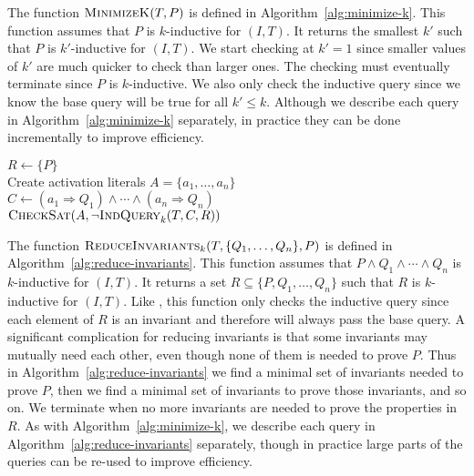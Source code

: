 The function $\textsc{MinimizeK}(T, P)$ is defined in
Algorithm~\ref{alg:minimize-k}. This function assumes that $P$ is
$k$-inductive for $(I, T)$. It returns the smallest $k'$ such that $P$
is $k'$-inductive for $(I, T)$. We start checking at $k' = 1$ since
smaller values of $k'$ are much quicker to check than larger ones. The
checking must eventually terminate since $P$ is $k$-inductive. We also
only check the inductive query since we know the base query will be
true for all $k' \leq k$. Although we describe each query in
Algorithm~\ref{alg:minimize-k} separately, in practice they can be
done incrementally to improve efficiency.

\begin{algorithm}[t]
  $R \leftarrow \{P\}$ \\
  Create activation literals $A = \{a_1, \ldots, a_n\}$ \\
  $C \leftarrow (a_1 \Rightarrow Q_1) \land \cdots \land (a_n \Rightarrow Q_n)$ \\
   {
    $\textsc{CheckSat}(A, \neg\textsc{IndQuery}_k(T, C, R))$ \\
  }
\caption{$\reduceinv_k(T, \{Q_1, \ldots, Q_n\}, P)$}
\label{alg:reduce-invariants}
\end{algorithm}

The function $\reduceinv_k(T, \{Q_1, \ldots, Q_n\}, P)$ is defined in
Algorithm~\ref{alg:reduce-invariants}. This function assumes that $P
\land Q_1 \land \cdots \land Q_n$ is $k$-inductive for $(I, T)$. It
returns a set $R \subseteq \{P, Q_1, \ldots, Q_n\}$ such that $R$ is
$k$-inductive for $(I, T)$. Like \mink, this function only checks the
inductive query since each element of $R$ is an invariant and
therefore will always pass the base query. A significant complication
for reducing invariants is that some invariants may mutually need each
other, even though none of them is needed to prove $P$. Thus in
Algorithm~\ref{alg:reduce-invariants} we find a minimal set of
invariants needed to prove $P$, then we find a minimal set of
invariants to prove those invariants, and so on. We terminate when no
more invariants are needed to prove the properties in $R$. As with
Algorithm~\ref{alg:minimize-k}, we describe each query in
Algorithm~\ref{alg:reduce-invariants} separately, though in practice
large parts of the queries can be re-used to improve efficiency.

